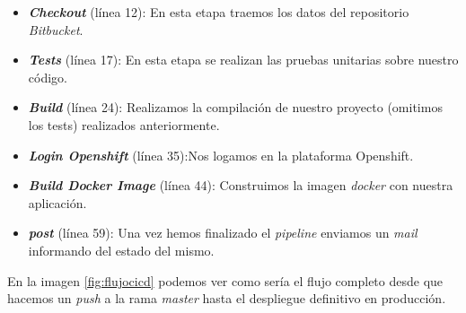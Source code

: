 \begin{itemize}
\item \textit{\textbf{Checkout}} (línea 12): En esta etapa traemos los datos del repositorio \textit{Bitbucket}. 

\item \textit{\textbf{Tests}} (línea 17): En esta etapa se realizan las pruebas unitarias sobre nuestro código.

\item \textit{\textbf{Build}} (línea 24): Realizamos la compilación de nuestro proyecto (omitimos los tests) realizados anteriormente.

\item \textit{\textbf{Login Openshift}} (línea 35):Nos logamos en la plataforma Openshift.

\item \textit{\textbf{Build Docker Image}} (línea 44): Construimos la imagen \textit{docker} con nuestra aplicación.

\item \textit{\textbf{post}} (línea 59): Una vez hemos finalizado el \textit{pipeline} enviamos un \textit{mail} informando del estado del mismo. 
 
\end{itemize}


En la imagen \ref{fig:flujocicd} podemos ver como sería el flujo completo desde que hacemos un \textit{push} a la rama \textit{master} hasta el despliegue definitivo en producción. 


